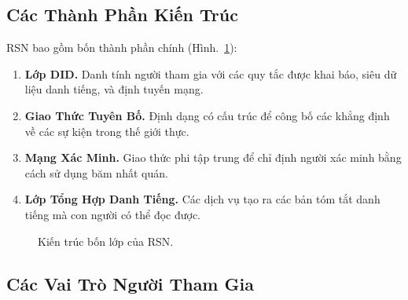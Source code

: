\documentclass[11pt,a4paper,twocolumn]{article}
\begin{document}
\subsection{Các Thành Phần Kiến Trúc}

RSN bao gồm bốn thành phần chính (Hình.~\ref{fig:architecture}):
\begin{enumerate}[nosep]
\item \textbf{Lớp DID.} Danh tính người tham gia với các quy tắc được khai báo, siêu dữ liệu danh tiếng, và định tuyến mạng.
\item \textbf{Giao Thức Tuyên Bố.} Định dạng có cấu trúc để công bố các khẳng định về các sự kiện trong thế giới thực.
\item \textbf{Mạng Xác Minh.} Giao thức phi tập trung để chỉ định người xác minh bằng cách sử dụng băm nhất quán.
\item \textbf{Lớp Tổng Hợp Danh Tiếng.} Các dịch vụ tạo ra các bản tóm tắt danh tiếng mà con người có thể đọc được.
\end{enumerate}

\begin{figure}[ht]
\centering
{}
\caption{Kiến trúc bốn lớp của RSN.}
\label{fig:architecture}
\end{figure}

\subsection{Các Vai Trò Người Tham Gia}
\end{document}
